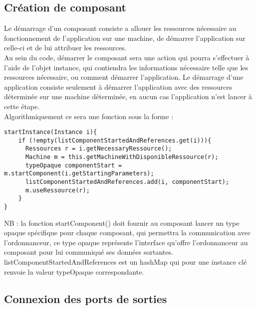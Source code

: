 \documentclass{article}
\begin{document}
\subsection{Création de composant}
Le démarrage d'un composant consiste a allouer les ressources nécessaire au fonctionnement de l'application sur une machine, de démarrer l'application sur celle-ci et de lui attribuer les ressources.\\
Au sein du code, démarrer le composant sera une action qui pourra s'effectuer à l'aide de l'objet instance, qui contiendra les informations nécessaire telle que les ressources nécessaire, ou comment démarrer l'application. Le démarrage d'une application consiste seulement à démarrer l'application avec des ressources déterminée sur une machine déterminée, en aucun cas l'application n'est lancer à cette étape.\\
Algorithmiquement ce sera une fonction sous la forme :
\begin{lstlisting}[]
startInstance(Instance i){
    if (!empty(listComponentStartedAndReferences.get(i))){
      Ressources r = i.getNecessaryRessource();
      Machine m = this.getMachineWithDisponibleRessource(r);
      typeOpaque componentStart = m.startComponent(i.getStartingParameters);
      listComponentStartedAndReferences.add(i, componentStart);
      m.useRessource(r);
    }
}
\end{lstlisting}
NB : la fonction startComponent() doit fournir au composant lancer un type opaque spécifique pour chaque composant, qui permettra la communication avec l'ordonnanceur, ce type opaque représente l'interface qu'offre l'ordonnanceur au composant pour lui communiqué ses données sortantes.\\
listComponentStartedAndReferences est un hashMap qui pour une instance clé renvoie la valeur typeOpaque correspondante.

\subsection{Connexion des ports de sorties}
\end{document}
